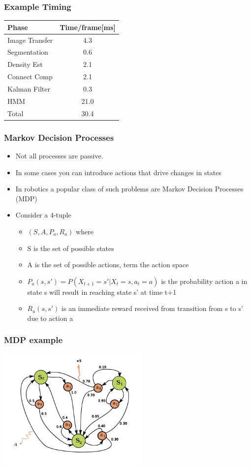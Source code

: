 \documentclass[10pt]{beamer}
\begin{document}
\begin{frame}
  \frametitle{Example Timing}
  \begin{center}
    \begin{tabular}[c]{|l|c|} \hline
      Phase & Time/frame[ms]\\ \hline\hline
      Image Transfer & 4.3\\
      Segmentation & 0.6\\
      Density Est & 2.1\\
      Connect Comp & 2.1 \\
      Kalman Filter & 0.3 \\
      HMM & 21.0 \\ \hline
      Total & 30.4 \\\hline
    \end{tabular}
  \end{center}
\end{frame}

\begin{frame}
  \frametitle{Markov Decision Processes}
  \begin{itemize}
  \item Not all processes are passive.
  \item In some cases you can introduce actions that drive changes in states
  \item In robotics a popular class of such problems are Markov Decision Processes (MDP)
  \item Consider a 4-tuple
    \begin{itemize}
    \item $(S, A, P_a, R_a)$ where
    \item S is the set of possible states
    \item A is the set of possible actions, term the action space
    \item $P_a(s,s') = P(X_{t+1}= s' | X_t = s, a_t = a)$ is the probability action a in state s will result in reaching state s' at time t+1
    \item $R_a(s,s')$ is an immediate reward received from transition from s to s' due to action a
    \end{itemize}
  \end{itemize}
\end{frame}

\begin{frame}
  \frametitle{MDP example}
  \vfill
  \centerline{\includegraphics[height=6cm]{Markov_Decision_Process.svg.png}}
\end{frame}
\end{document}
